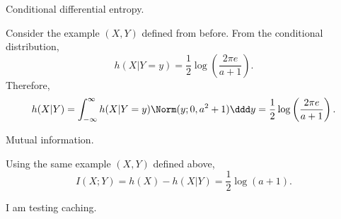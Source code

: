 \begin{example}
\exlabel

Conditional differential entropy.
\end{example}

\noindent Consider the example $(X,Y)$ defined from before. From the conditional distribution, 
\[h(X|Y=y) = \frac{1}{2}\log\left(\frac{2\pi e}{a+1}\right).\] 
Therefore, 
\[h(X|Y) = \int_{-\infty}^{\infty}h(X|Y=y)\Norm(y;0,a^2+1)\ddd y = \frac{1}{2} \log \left(\frac{2\pi e}{a+1}\right).\] 

\begin{example}
\exlabel

Mutual information.
\end{example}

\noindent Using the same example $(X,Y)$ defined above,
\[I(X;Y) = h(X) - h(X|Y) = \frac{1}{2}\log(a+1).\] 

I am testing caching. 
